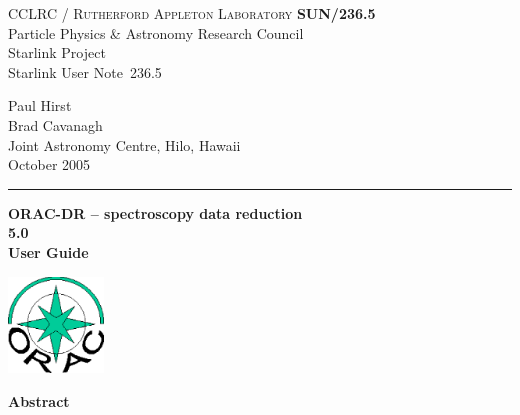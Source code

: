 \documentclass[twoside,11pt]{article}
\newcommand{\stardoccategory}  {Starlink User Note}
\newcommand{\stardocinitials}  {SUN}
\newcommand{\stardocnumber}    {236.5}
\newcommand{\stardocauthors}   {Paul Hirst \\ Brad Cavanagh \\
                                Joint Astronomy Centre, Hilo, Hawaii}
\newcommand{\stardocdate}      {October 2005}
\newcommand{\stardoctitle}     {ORAC-DR -- spectroscopy data reduction}
\newcommand{\stardocversion}   {5.0}
\newcommand{\stardocmanual}    {User Guide}
\newcommand{\stardocname}{\stardocinitials /\stardocnumber}
\newenvironment{latexonly}{}{}
\renewcommand{\_}{\texttt{\symbol{95}}}
\begin{document}
\setcounter{secnumdepth}{5}
\thispagestyle{empty}

\begin{latexonly}
   CCLRC / \textsc{Rutherford Appleton Laboratory} \hfill \textbf{\stardocname}\\
   {\large Particle Physics \& Astronomy Research Council}\\
   {\large Starlink Project\\}
   {\large \stardoccategory\ \stardocnumber}
   \begin{flushright}
   \stardocauthors\\
   \stardocdate
   \end{flushright}
   \vspace{-4mm}
   \rule{\textwidth}{0.5mm}
   \vspace{5mm}
   \begin{center}
   {\Huge\textbf{\stardoctitle \\ [2.5ex]}}
   {\LARGE\textbf{\stardocversion \\ [4ex]}}
   {\Huge\textbf{\stardocmanual}}
   \end{center}
   \vspace{5mm}

\begin{center}
\includegraphics[width=1.0in]{sun236_logo.eps}
\end{center}

   \vspace{10mm}
   \begin{center}
      {\Large\textbf{Abstract}}
   \end{center}
\end{latexonly}
\end{document}
